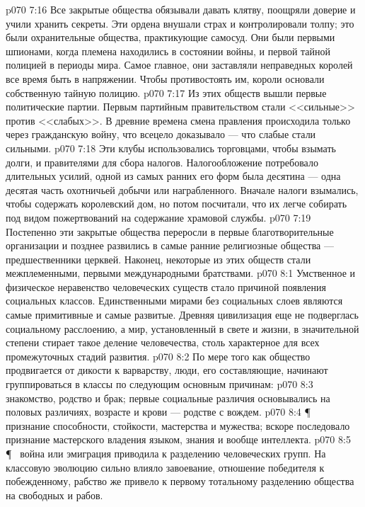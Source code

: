 \vs p070 7:16 Все закрытые общества обязывали давать клятву, поощряли доверие и учили хранить секреты. Эти ордена внушали страх и контролировали толпу; это были охранительные общества, практикующие самосуд. Они были первыми шпионами, когда племена находились в состоянии войны, и первой тайной полицией в периоды мира. Самое главное, они заставляли неправедных королей все время быть в напряжении. Чтобы противостоять им, короли основали собственную тайную полицию.
\vs p070 7:17 Из этих обществ вышли первые политические партии. Первым партийным правительством стали <<сильные>> против <<слабых>>. В древние времена смена правления происходила только через гражданскую войну, что всецело доказывало --- что слабые стали сильными.
\vs p070 7:18 Эти клубы использовались торговцами, чтобы взымать долги, и правителями для сбора налогов. Налогообложение потребовало длительных усилий, одной из самых ранних его форм была десятина --- одна десятая часть охотничьей добычи или награбленного. Вначале налоги взымались, чтобы содержать королевский дом, но потом посчитали, что их легче собирать под видом пожертвований на содержание храмовой службы.
\vs p070 7:19 Постепенно эти закрытые общества переросли в первые благотворительные организации и позднее развились в самые ранние религиозные общества --- предшественники церквей. Наконец, некоторые из этих обществ стали межплеменными, первыми международными братствами.
\vs p070 8:1 Умственное и физическое неравенство человеческих существ стало причиной появления социальных классов. Единственными мирами без социальных слоев являются самые примитивные и самые развитые. Древняя цивилизация еще не подверглась социальному расслоению, а мир, установленный в свете и жизни, в значительной степени стирает такое деление человечества, столь характерное для всех промежуточных стадий развития.
\vs p070 8:2 По мере того как общество продвигается от дикости к варварству, люди, его составляющие, начинают группироваться в классы по следующим основным причинам:
\vs p070 8:3 \bibnobreakspace {} знакомство, родство и брак; первые социальные различия основывались на половых различиях, возрасте и крови --- родстве с вождем.
\vs p070 8:4 \P\ \bibnobreakspace {} признание способности, стойкости, мастерства и мужества; вскоре последовало признание мастерского владения языком, знания и вообще интеллекта.
\vs p070 8:5 \P\ \bibnobreakspace {} война или эмиграция приводила к разделению человеческих групп. На классовую эволюцию сильно влияло завоевание, отношение победителя к побежденному, рабство же привело к первому тотальному разделению общества на свободных и рабов.
